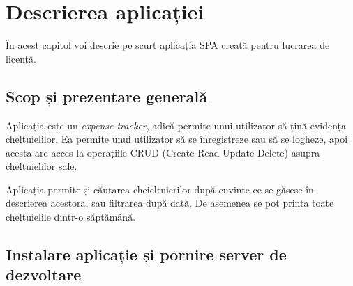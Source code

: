 \chapter{Descrierea aplicației}

În acest capitol voi descrie pe scurt aplicația SPA creată
pentru lucrarea de licență.

\section{Scop și prezentare generală}

Aplicația este un \emph{expense tracker},
adică permite unui utilizator să țină evidența
cheltuielilor. Ea permite unui utilizator 
să se înregistreze sau să se logheze,
apoi acesta are acces la operațiile
CRUD (Create Read Update Delete) asupra cheltuielilor sale.

Aplicația permite și căutarea cheieltuierilor
după cuvinte ce se găsesc în descrierea acestora,
sau filtrarea după dată. De asemenea se pot printa
toate cheltuielile dintr-o săptămână.


\section{Instalare aplicație și pornire server de dezvoltare}


